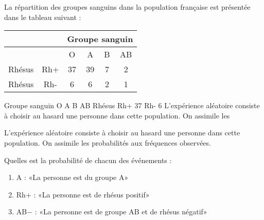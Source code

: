 
La répartition des groupes sanguins dans la population française est présentée dans le tableau suivant :



\begin{tabular}{|c|c|c|c|c|c|}
\hline 
 &  & \multicolumn{4}{c|}{Groupe sanguin} \\ 
\hline 
 &  & O & A &B  & AB \\ 
\hline 
Rhésus & Rh+ & 37 & 39 & 7 & 2 \\ 
\hline 
Rhésus & Rh- & 6 & 6 & 2 & 1 \\ 
\hline 
\end{tabular} 
Groupe sanguin
O A B AB
Rhésus
Rh+ 37%
Rh- 6%
L'expérience aléatoire consiste à choisir au hasard une personne dans cette population. On assimile les


L'expérience aléatoire consiste à choisir au hasard une personne dans cette population. On assimile les
probabilités aux fréquences observées.

Quelles est la probabilité de chacun des événements :
\begin{enumerate}
\item A : «La personne est du groupe A»
\item Rh+ : «La personne est de rhésus positif»
\item AB− : «La personne est de groupe AB et de rhésus négatif»
\end{enumerate}
